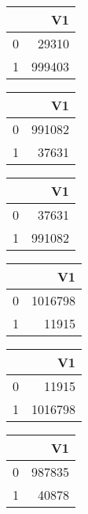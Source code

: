 \bigskip\bigskip
\centering
\begin{tabular}{rr}
  \hline
 & V1 \\ 
  \hline
0 & 29310 \\ 
  1 & 999403 \\ 
   \hline
\end{tabular}

\bigskip\bigskip
\centering
\begin{tabular}{rr}
  \hline
 & V1 \\ 
  \hline
0 & 991082 \\ 
  1 & 37631 \\ 
   \hline
\end{tabular}

\bigskip\bigskip
\centering
\begin{tabular}{rr}
  \hline
 & V1 \\ 
  \hline
0 & 37631 \\ 
  1 & 991082 \\ 
   \hline
\end{tabular}

\bigskip\bigskip
\centering
\begin{tabular}{rr}
  \hline
 & V1 \\ 
  \hline
0 & 1016798 \\ 
  1 & 11915 \\ 
   \hline
\end{tabular}

\bigskip\bigskip
\centering
\begin{tabular}{rr}
  \hline
 & V1 \\ 
  \hline
0 & 11915 \\ 
  1 & 1016798 \\ 
   \hline
\end{tabular}

\bigskip\bigskip
\centering
\begin{tabular}{rr}
  \hline
 & V1 \\ 
  \hline
0 & 987835 \\ 
  1 & 40878 \\ 
   \hline
\end{tabular}

